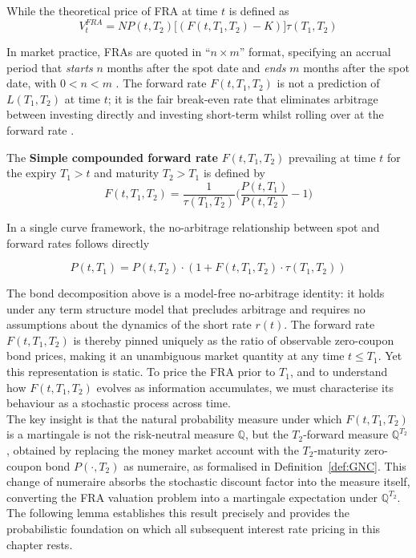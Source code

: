     \noindent
    While the theoretical price of FRA at time $t$ is defined as 
    \begin{equation} 
        V^{FRA}_t = N P(t,T_2)\big[(F(t,T_1,T_2)-K)\big]\tau(T_1,T_2)  
    \end{equation}

    \noindent
    In market practice, FRAs are quoted in ``$n\times m$'' format, specifying an accrual period that \emph{starts} $n$ months after the spot date and \emph{ends} $m$ months after the spot date, with $0 < n < m$ \cite{duffy2013c}. The forward rate $F(t,T_1,T_2)$ is not a prediction of $L(T_1,T_2)$ at time $t$; it is the fair break-even rate that eliminates arbitrage between investing directly and investing short-term whilst rolling over at the forward rate \cite{oosterlee2019mathematical}.

        
    \begin{definition}\label{def:forward_rate}
    The \textbf{Simple compounded forward rate}  $F(t,T_1,T_2)$  prevailing at time $t$ for the expiry $T_1 > t$ and maturity $T_2 > T_1$ is defined by  
    \begin{equation}
        F(t,T_1,T_2)  =  \frac{1}{\tau(T_1,T_2)} \Big( \frac{P(t,T_1)}{P(t,T_2)}  -1\Big)  
    \end{equation}
    
    \end{definition}

    \noindent
     In a single curve framework, the no-arbitrage relationship between spot and forward rates follows directly

    \begin{equation}
    P(t,T_1)  = P(t,T_2) \cdot(1+ F(t,T_1,T_2) \cdot \tau(T_1,T_2))
    \end{equation}

    \noindent
    The bond decomposition above is a model-free no-arbitrage identity: it holds under any term structure model that precludes arbitrage and requires no assumptions about the dynamics of the short rate $r(t)$. The forward rate $F(t,T_1,T_2)$ is thereby pinned uniquely as the ratio of observable zero-coupon bond prices, making it an unambiguous market quantity at any time $t \le T_1$. Yet this representation is static. To price the FRA prior to $T_1$, and to understand how $F(t,T_1,T_2)$ evolves as information accumulates, we must characterise its behaviour as a stochastic process across time.\\

    \noindent
    The key insight is that the natural probability measure under which $F(t,T_1,T_2)$ is a martingale is not the risk-neutral measure $\mathbb{Q}$, but the $T_2$-forward measure $\mathbb{Q}^{T_2}$, obtained by replacing the money market account with the $T_2$-maturity zero-coupon bond $P(\cdot,T_2)$ as numeraire, as formalised in Definition~\ref{def:GNC}. This change of numeraire absorbs the stochastic discount factor into the measure itself, converting the FRA valuation problem into a martingale expectation under $\mathbb{Q}^{T_2}$. The following lemma establishes this result precisely and provides the probabilistic foundation on which all subsequent interest rate pricing in this chapter rests.\\

